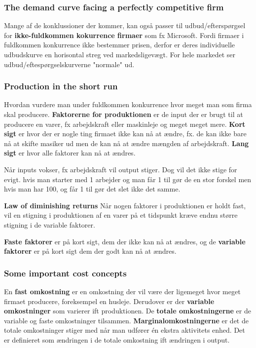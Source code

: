 \subsubsection{The demand curve facing a perfectly competitive firm}
Mange af de konklussioner der kommer, kan også passer til udbud/efterspørgsel for  \textbf{ikke-fuldkommen kokurrence firmaer} som fx Microsoft.
Fordi firmaer i fuldkommen konkurrence ikke bestemmer prisen, derfor er deres individuelle udbudskurve en horisontal streg ved markedsligevægt. For hele markedet ser udbud/eftespørgselskurverne "normale" ud. 

\subsubsection{Production in the short run}
Hvordan vurdere man under fuldkommen konkurrence hvor meget man som firma skal producere. \textbf{Faktorerne for produktionen} er de input der er brugt til at producere en varer, fx arbejdskraft eller maskinleje og meget meget mere. \textbf{Kort sigt} er hvor der er nogle ting firmaet ikke kan nå at ændre, fx. de kan ikke bare nå at skifte masiker ud men de kan nå at ændre mængden af arbejdskraft. \textbf{Lang sigt} er hvor alle faktorer kan nå at ændres. 

Når inputs vokser, fx arbejdskraft vil output stiger. Dog vil det ikke stige for evigt. hvis man starter med 1 arbejder og man får 1 til gør de en stor forskel men hvis man har 100, og får 1 til gør det slet ikke det samme. 

\begin{defn}\textbf{Law of diminishing returns} %
\newline
Når nogen faktorer i produktionen er holdt fast, vil en stigning i produktionen af en varer på et tidspunkt kræve endnu større stigning i de variable faktorer. 
\end{defn}

\textbf{Faste faktorer} er på kort sigt, dem der ikke kan nå at ændres, og de \textbf{variable faktorer} er på kort sigt dem der godt kan nå at ændres. 

\subsubsection{Some important cost concepts}
En \textbf{fast omkostning} er en omkostning der vil være der ligemeget hvor meget firmaet producere, foreksempel en husleje. Derudover er der \textbf{variable omkostninger} som varierer ift produktionen. De \textbf{totale omkostningerne} er de variable og faste omkostninger tilsammen. 
\textbf{Marginalomkostningerne} er det de totale omkostninger stiger med når man udfører én ekstra aktivitets enhed. Det er definieret som ændringen i de totale omkostning ift ændringen i output. 


